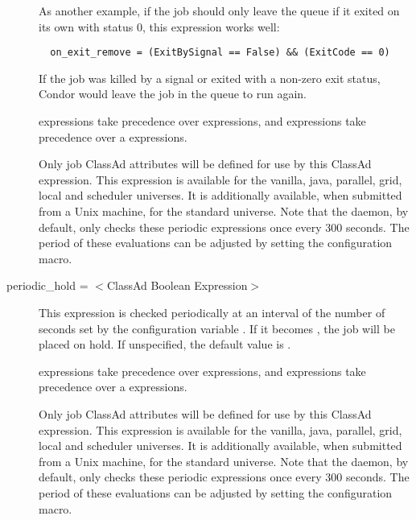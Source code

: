 \begin{description}
As another example,
if the job should only leave the queue if it exited on its own with
status 0,
this  expression works well:

\footnotesize
\begin{verbatim}
  on_exit_remove = (ExitBySignal == False) && (ExitCode == 0)
\end{verbatim}
\normalsize
If the job was killed by a signal or exited with a non-zero exit
status, Condor would leave the job in the queue to run again.

 expressions take
precedence over  expressions,
and  expressions take
precedence over a  expressions.

Only job ClassAd attributes will be defined for use by this ClassAd expression.
This expression is available for the vanilla, java, parallel, grid,
local and scheduler universes.
It is additionally available, when submitted from a Unix machine, for the
standard universe.  Note that the  daemon,
by default, only checks
these periodic expressions once every 300 seconds.  The period of
these evaluations can be adjusted by setting the
 configuration macro.



\item[periodic\_hold = $<$ClassAd Boolean Expression$>$]
This expression is checked periodically at an interval of
the number of seconds set by
the configuration variable .
If it becomes , the job will be placed on hold.
If unspecified, the default value is .

 expressions take
precedence over  expressions,
and  expressions take
precedence over a  expressions.

Only job ClassAd attributes will be defined for use by this ClassAd expression.
This expression is available for the vanilla, java, parallel, grid,
local and scheduler universes.
It is additionally available, when submitted from a Unix machine,
for the standard universe.  Note that the  daemon,
by default, only checks
these periodic expressions once every 300 seconds.  The period of
these evaluations can be adjusted by setting the
 configuration macro.


\end{description}
